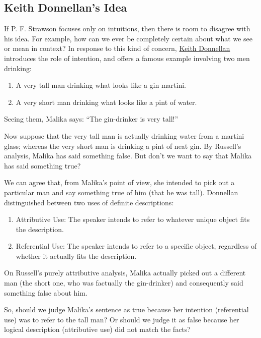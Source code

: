 \documentclass[12pt,a4paper,openany]{article}
\begin{document}
\subsection{Keith Donnellan's Idea}
\label{donnellans-idea}

If P. F. Strawson focuses only on intuitions, then there is room to disagree with his idea. For example, how can we ever be completely certain about what we see or mean in context? In response to this kind of concern, \href{https://en.wikipedia.org/wiki/Keith_Donnellan}{Keith
Donnellan} introduces the role of intention, and offers a famous example involving two men drinking:

\begin{enumerate}
    \item A very tall man drinking what looks like a gin martini.
    \item A very short man drinking what looks like a pint of water.
\end{enumerate}

Seeing them, Malika says: “The gin-drinker is very tall!”

Now suppose that the very tall man is actually drinking water from a martini glass; whereas the very short man is drinking a pint of neat gin. By Russell's analysis, Malika has said something false. But don't we want to say that Malika has said something true?

We can agree that, from Malika's point of view, she intended to pick out a particular man and say something true of him (that he was tall). Donnellan distinguished between two uses of definite descriptions:

\begin{enumerate}
    \item Attributive Use: The speaker intends to refer to whatever unique object fits the description.
    \item Referential Use: The speaker intends to refer to a specific object, regardless of whether it actually fits the description. 
\end{enumerate}

On Russell's purely attributive analysis, Malika actually picked out a different man (the short one, who was factually the gin-drinker) and consequently said something false about him.

So, should we judge Malika's sentence as true because her intention (referential use) was to refer to the tall man? Or should we judge it as false because her logical description (attributive use) did not match the facts?
\end{document}
